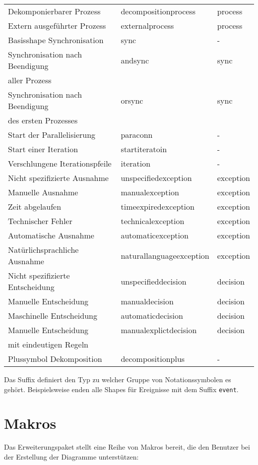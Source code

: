 \documentclass[12pt, a4paper]{article}
\begin{document}
\begin{longtable}{lll}
        Dekomponierbarer Prozess & decompositionprocess & process \\
        Extern ausgeführter Prozess & externalprocess & process \\
        Basisshape Synchronisation & sync & - \\
        Synchronisation nach Beendigung & andsync & sync \\
        aller Prozess & & \\
        Synchronisation nach Beendigung & orsync & sync \\
        des ersten Prozesses & & \\
        Start der Parallelisierung & paraconn & - \\
        Start einer Iteration & startiteratoin & - \\
        Verschlungene Iterationspfeile & iteration & - \\
        Nicht spezifizierte Ausnahme & unspecifiedexception & exception \\
        Manuelle Ausnahme & manualexception & exception \\
        Zeit abgelaufen & timeexpiredexception & exception \\
        Technischer Fehler & technicalexception & exception \\
        Automatische Ausnahme & automaticexception & exception \\
        Natürlichsprachliche Ausnahme & naturallanguageexception & exception \\
        Nicht spezifizierte Entscheidung & unspecifieddecision & decision \\
        Manuelle Entscheidung & manualdecision & decision \\
        Maschinelle Entscheidung & automaticdecision & decision \\
        Manuelle Entscheidung & manualexplictdecision & decision \\
        mit eindeutigen Regeln & & \\
        Plussymbol Dekomposition & decompositionplus & - \\
        \bottomrule    
\end{longtable}
\noindent Das Suffix definiert den Typ zu welcher Gruppe von Notationssymbolen es gehört. Beispielsweise enden alle Shapes für Ereignisse mit dem Suffix \texttt{event}.\newpage

\section{Makros}
\label{sec:Makros}
Das Erweiterungspaket stellt eine Reihe von Makros bereit, die den Benutzer bei der Erstellung der Diagramme unterstützen:\medskip
\end{document}
